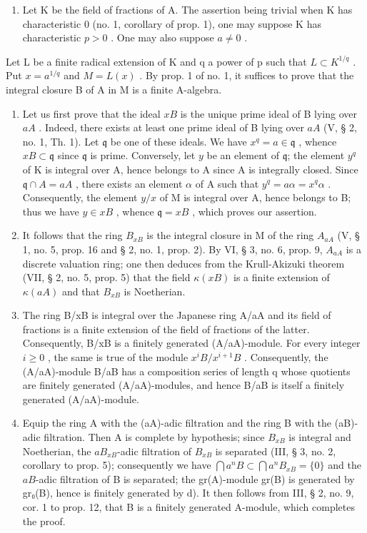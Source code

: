 \begin{enumerate}
\def\labelenumi{\alph{enumi})}
\tightlist
\item
  Let K be the field of fractions of A. The assertion being trivial when K has characteristic 0 (no. 1, corollary of prop. 1), one may suppose K has characteristic \(p > 0\) . One may also suppose \(a \neq 0\) .
\end{enumerate}

Let L be a finite radical extension of K and q a power of p such that \(L \subset K^{1/q}\) . Put \(x = a^{1/q}\) and \(M = L(x)\) . By prop. 1 of no. 1, it suffices to prove that the integral closure B of A in M is a finite A-algebra.

\begin{enumerate}
\def\labelenumi{\alph{enumi})}
\setcounter{enumi}{1}
\item
  Let us first prove that the ideal \(xB\) is the unique prime ideal of B lying over \(aA\) . Indeed, there exists at least one prime ideal of B lying over \(aA\) (V, § 2, no. 1, Th. 1). Let \(\mathfrak{q}\) be one of these ideals. We have \(x^{q} = a \in \mathfrak{q}\) , whence \(xB \subset \mathfrak{q}\) since \(\mathfrak{q}\) is prime. Conversely, let \(y\) be an element of \(\mathfrak{q}\); the element \(y^{q}\) of K is integral over A, hence belongs to A since A is integrally closed. Since \(\mathfrak{q} \cap A = aA\) , there exists an element \(\alpha\) of A such that \(y^{q} = a\alpha = x^{q}\alpha\) . Consequently, the element \(y/x\) of M is integral over A, hence belongs to B; thus we have \(y \in xB\) , whence \(\mathfrak{q} = xB\) , which proves our assertion.
\item
  It follows that the ring \(B_{xB}\) is the integral closure in M of the ring \(A_{aA}\) (V, § 1, no. 5, prop. 16 and § 2, no. 1, prop. 2). By VI, § 3, no. 6, prop. 9, \(A_{aA}\) is a discrete valuation ring; one then deduces from the Krull-Akizuki theorem (VII, § 2, no. 5, prop. 5) that the field \(\kappa(xB)\) is a finite extension of \(\kappa(aA)\) and that \(B_{xB}\) is Noetherian.
\item
  The ring B/xB is integral over the Japanese ring A/aA and its field of fractions is a finite extension of the field of fractions of the latter. Consequently, B/xB is a finitely generated (A/aA)-module. For every integer \(i \geqslant 0\) , the same is true of the module \(x^{i}B/x^{i+1}B\) . Consequently, the (A/aA)-module B/aB has a composition series of length q whose quotients are finitely generated (A/aA)-modules, and hence B/aB is itself a finitely generated (A/aA)-module.
\item
  Equip the ring A with the (aA)-adic filtration and the ring B with the (aB)-adic filtration. Then A is complete by hypothesis; since \(B_{xB}\) is integral and Noetherian, the \(aB_{xB}\)-adic filtration of \(B_{xB}\) is separated (III, § 3, no. 2, corollary to prop. 5); consequently we have \(\bigcap a^{n}B \subset \bigcap a^{n}B_{xB} = \{0\}\) and the \(aB\)-adic filtration of B is separated; the gr(A)-module gr(B) is generated by gr₀(B), hence is finitely generated by d). It then follows from III, § 2, no. 9, cor. 1 to prop. 12, that B is a finitely generated A-module, which completes the proof.
\end{enumerate}

